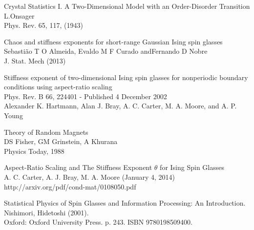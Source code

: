 \documentclass[paper=a4, fontsize=11pt]{scrartcl} %
\numberwithin{equation}{section} %
\numberwithin{figure}{section} %
\numberwithin{table}{section} %
\begin{document}
\pagebreak

\begin{thebibliography}{100}

Crystal Statistics I. A Two-Dimensional Model with an Order-Disorder Transition \\
L.Onsager \\
Phys. Rev. 65, 117, (1943)

Chaos and stiffness exponents for short-range Gaussian Ising spin glasses \\
Sebasti\~{a}o T O Almeida, Evaldo M F Curado andFernando D Nobre \\
J. Stat. Mech (2013)

Stiffness exponent of two-dimensional Ising spin glasses for nonperiodic boundary conditions using aspect-ratio scaling \\
Phys. Rev. B 66, 224401 - Published 4 December 2002 \\
Alexander K. Hartmann, Alan J. Bray, A. C. Carter, M. A. Moore, and A. P. Young

Theory of Random Magnets \\
DS Fisher, GM Grinstein, A Khurana \\
Physics Today, 1988 

Aspect-Ratio Scaling and The Stiffness Exponent $\theta$ for Ising Spin Glasses \\
A. C. Carter, A. J. Bray, M. A. Moore (January 4, 2014) \\
http://arxiv.org/pdf/cond-mat/0108050.pdf

Statistical Physics of Spin Glasses and Information Processing: An Introduction. \\
Nishimori, Hidetoshi (2001). \\
Oxford: Oxford University Press. p. 243. ISBN 9780198509400.

\end{thebibliography}
\end{document}
